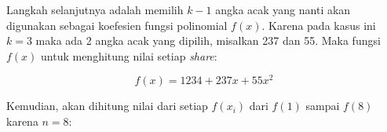 Langkah selanjutnya adalah memilih \begin{math}k-1\end{math} angka acak yang nanti akan digunakan sebagai koefesien fungsi polinomial \begin{math}f(x)\end{math}. Karena pada kasus ini \begin{math}k=3\end{math} maka ada 2 angka acak yang dipilih, misalkan 237 dan 55. Maka fungsi \begin{math}f(x)\end{math} untuk menghitung nilai setiap \textit{share}:

\begin{displaymath}
	f(x) = 1234 + 237x + 55x^2
\end{displaymath}

Kemudian, akan dihitung nilai dari setiap \begin{math}f(x_i)\end{math} dari \begin{math}f(1)\end{math} sampai \begin{math}f(8)\end{math} karena \begin{math}n=8\end{math}:

